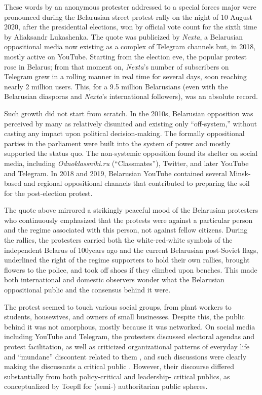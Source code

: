 These words by an anonymous protester addressed to a special forces major were pronounced during the Belarusian street protest rally on the night of 10 August 2020, after the presidential elections, won by official vote count for the sixth time by Aliaksandr Lukashenka. The quote was publicized by \textit{Nexta}, a Belarusian oppositional media now existing as a complex of Telegram channels but, in 2018, mostly active on YouTube. Starting from the election eve, the popular protest rose in Belarus; from that moment on, \textit{Nexta}’s number of subscribers on Telegram grew in a rolling manner in real time for several days, soon reaching nearly 2 million users. This, for a 9.5 million Belarusians (even with the Belarusian diasporas and \textit{Nexta}’s international followers), was an absolute record.

Such growth did not start from scratch. In the 2010s, Belarusian opposition was perceived by many as relatively disunited and existing only “off-system,” without casting any impact upon political decision-making. The formally oppositional parties in the parliament were built into the system of power and mostly supported the status quo. The non-systemic opposition found its shelter on social media, including \textit{Odnoklassniki.ru} (“Classmates”), Twitter, and later YouTube and Telegram. In 2018 and 2019, Belarusian YouTube contained several Minsk-based and regional oppositional channels that contributed to preparing the soil for the post-election protest.

The quote above mirrored a strikingly peaceful mood of the Belarusian protesters who continuously emphasized that the protests were against a particular person and the regime associated with this person, not against fellow citizens. During the rallies, the protesters carried both the white-red-white symbols of the independent Belarus of 100years ago and the current Belarusian post-Soviet flags, underlined the right of the regime supporters to hold their own rallies, brought flowers to the police, and took off shoes if they climbed upon benches. This made both international and domestic observers wonder what the Belarusian oppositional public and the consensus behind it were.

The protest seemed to touch various social groups, from plant workers to students, housewives, and owners of small businesses. Despite this, the public behind it was not amorphous, mostly because it was networked. On social media including YouTube and Telegram, the protesters discussed electoral agendas and protest facilitation, as well as criticized organizational patterns of everyday life and “mundane” discontent related to them \cite{SmoliarovaBodrunova}, and such discussions were clearly making the discussants a critical public \cite{Toepfl}. However, their discourse differed substantially from both policy-critical and leadership- critical publics, as conceptualized by Toepfl for (semi-) authoritarian public spheres.

